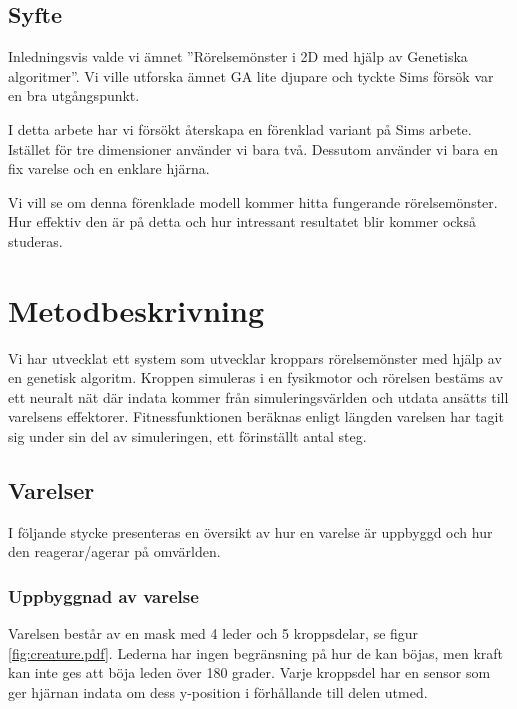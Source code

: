 \documentclass[titlepage, twocolumn, a4paper, 11pt, swedish]{article}
\begin{document}
\subsection{Syfte}
Inledningsvis valde vi ämnet ''Rörelse\-mönster i 2D med hjälp av Genetiska algoritmer''. Vi ville utforska ämnet GA lite djupare och tyckte Sims försök var en bra utgångspunkt. 

I detta arbete har vi försökt återskapa en förenklad variant på Sims arbete. Istället för tre dimensioner använder vi bara två. Dessutom använder vi bara en fix varelse och en enklare hjärna. 

Vi vill se om denna förenklade modell kommer hitta fungerande rörelsemönster. Hur effektiv den är på detta och hur intressant resultatet blir kommer också studeras. 




\section{Metodbeskrivning}
Vi har utvecklat ett system som utvecklar kroppars rörelsemönster med hjälp av en genetisk algoritm. Kroppen simuleras i en fysikmotor och rörelsen bestäms av ett neuralt nät där indata kommer från simuleringsvärlden och utdata ansätts till varelsens effektorer. Fitnessfunktionen beräknas enligt längden varelsen har tagit sig under sin del av simuleringen, ett förinställt antal steg.


\subsection{Varelser}
I följande stycke presenteras en översikt av hur en varelse är uppbyggd och hur den reagerar/agerar på omvärlden.

\subsubsection{Uppbyggnad av varelse}\label{sec:uppbyggnadVarelse}
Varelsen består av en mask med 4 leder och 5 kroppsdelar, se figur \vref{fig:creature.pdf}. Lederna har ingen begränsning på hur de kan böjas, men kraft kan inte ges att böja leden över 180 grader. Varje kroppsdel har en sensor som ger hjärnan indata om dess y-position i förhållande till delen utmed.
\end{document}
